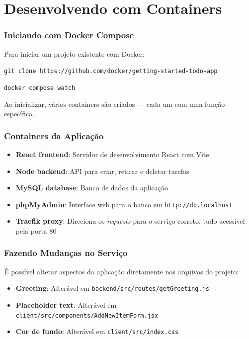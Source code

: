 \section{Desenvolvendo com Containers}

\begin{frame}
  \frametitle{Iniciando com Docker Compose}
  Para iniciar um projeto existente com Docker:

  \vspace{0.5em}
  \texttt{git clone https://github.com/docker/getting-started-todo-app}

  \vspace{0.3em}
  \texttt{docker compose watch}

  \vspace{0.5em}
  Ao inicializar, vários containers são criados — cada um com uma função específica.
\end{frame}

\begin{frame}
  \frametitle{Containers da Aplicação}
  \begin{itemize}
    \item \textbf{React frontend}: Servidor de desenvolvimento React com Vite
    \item \textbf{Node backend}: API para criar, retirar e deletar tarefas
    \item \textbf{MySQL database}: Banco de dados da aplicação
    \item \textbf{phpMyAdmin}: Interface web para o banco em \texttt{http://db.localhost}
    \item \textbf{Traefik proxy}: Direciona os \textit{requests} para o serviço correto,
          tudo acessível pela porta 80
  \end{itemize}
\end{frame}

\begin{frame}
  \frametitle{Fazendo Mudanças no Serviço}
  É possível alterar aspectos da aplicação diretamente nos arquivos do projeto:

  \vspace{0.5em}
  \begin{itemize}
    \item \textbf{Greeting}: Alterável em \texttt{backend/src/routes/getGreeting.js}
    \item \textbf{Placeholder text}: Alterável em \texttt{client/src/components/AddNewItemForm.jsx}
    \item \textbf{Cor de fundo}: Alterável em \texttt{client/src/index.css}
  \end{itemize}
\end{frame}

